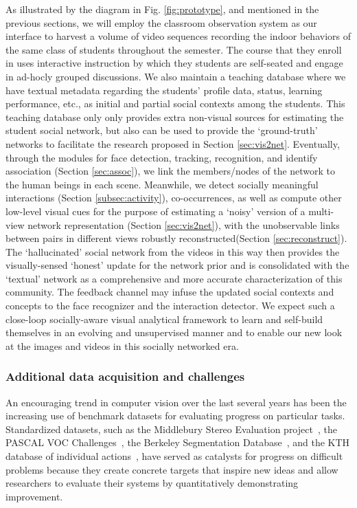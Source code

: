 As illustrated by the diagram in Fig. \ref{fig:prototype}, and mentioned in the previous sections, we will employ the classroom observation system as our interface to harvest a volume of video sequences recording the indoor behaviors of the same class of students throughout the semester. The course that they enroll in uses interactive instruction by which they students are self-seated and engage in ad-hocly grouped discussions. We also maintain a teaching database where we have textual metadata regarding the students' profile data, status, learning performance, etc., as initial and partial social contexts among the students. This teaching database only only provides extra non-visual sources for estimating the student social network, but also can be used to provide the `ground-truth' networks to facilitate the research proposed in Section \ref{sec:vis2net}. Eventually, through the modules for face detection, tracking, recognition, and identify association (Section \ref{sec:assoc}), we link the members/nodes of the network to the human beings in each scene. Meanwhile, we detect socially meaningful interactions (Section \ref{subsec:activity}), co-occurrences, as well as compute other low-level visual cues for the purpose of estimating a `noisy' version of a multi-view network representation (Section \ref{sec:vis2net}), with the unobservable links between pairs in different views robustly reconstructed(Section \ref{sec:reconstruct}). The `hallucinated' social network from the videos in this way then provides the visually-sensed `honest' update for the network prior and is consolidated with the `textual' network as a comprehensive and more accurate characterization of this community. The feedback channel may infuse the updated social contexts and concepts to the face recognizer and the interaction detector. We expect such a close-loop socially-aware visual analytical framework to learn and self-build themselves in an evolving and unsupervised manner and to enable our new look at the images and videos in this socially networked era.


\subsubsection{Additional data acquisition and challenges}

An encouraging trend in computer vision over the last several years has been the increasing use of benchmark datasets for evaluating progress on particular tasks. Standardized datasets, such as the Middlebury Stereo Evaluation project~\cite{}, the PASCAL VOC Challenges~\cite{}, the Berkeley Segmentation Database~\cite{}, and the KTH database of individual actions~\cite{}, have served as catalysts for progress on difficult problems because they create concrete targets that inspire new ideas and allow researchers to evaluate their systems by quantitatively demonstrating improvement.


